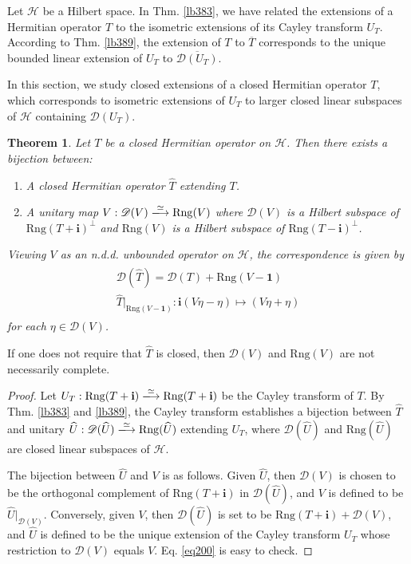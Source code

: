 \documentclass[12pt,b5paper,notitlepage]{article}
\theoremstyle{definition}
\theoremstyle{plain}
\newtheorem{thm}[df]{Theorem}
\newcommand{\wht}{\widehat}
\newcommand{\ovl}{\overline}
\newcommand{\idt}{\mathbf{1}}
\newcommand{\Dom}{\mathscr{D}}
\newcommand{\im}{\mathbf{i}}
\newcommand{\Rng}{\mathrm{Rng}}
\newcommand{\MH}{\mathcal H}
\numberwithin{equation}{section}
\begin{document}
Let $\MH$ be a Hilbert space. In Thm. \ref{lb383}, we have related the extensions of a Hermitian operator $T$ to the isometric extensions of its Cayley transform $U_T$. According to Thm. \ref{lb389}, the extension of $T$ to $\ovl T$ corresponds to the unique bounded linear extension of $U_T$ to $\ovl{\Dom(U_T)}$.

In this section, we study closed extensions of a closed Hermitian operator $T$, which corresponds to isometric extensions of $U_T$ to larger closed linear subspaces of $\MH$ containing $\Dom(U_T)$.



\begin{thm}\label{lb396}
Let $T$ be a closed Hermitian operator on $\MH$. Then there exists a bijection between:
\begin{enumerate}
\item[(1)] A closed Hermitian operator $\wht T$ extending $T$.
\item[(2)] A unitary map $V:\Dom(V)\xlongrightarrow{\simeq}\Rng(V)$ where $\Dom(V)$ is a Hilbert subspace of $\Rng(T+\im)^\perp$ and $\Rng(V)$ is a Hilbert subspace of $\Rng(T-\im)^\perp$.
\end{enumerate}
Viewing $V$ as an n.d.d. unbounded operator on $\MH$, the correspondence is given by
\begin{gather}\label{eq200}
\begin{gathered}
\Dom(\wht T)=\Dom(T)+\Rng(V-\idt)\\
\wht T|_{\Rng(V-\idt)}:\im(V\eta-\eta)\mapsto (V\eta+\eta)
\end{gathered}
\end{gather}
for each $\eta\in\Dom(V)$.
\end{thm}

If one does not require that $\wht T$ is closed, then $\Dom(V)$ and $\Rng(V)$ are not necessarily complete.

\begin{proof}
Let $U_T:\Rng(T+\im)\xlongrightarrow{\simeq}\Rng(T+\im)$ be the Cayley transform of $T$. By Thm. \ref{lb383} and \ref{lb389}, the Cayley transform establishes a bijection between $\wht T$ and unitary $\wht U:\Dom(\wht U)\xlongrightarrow{\simeq}\Rng(\wht U)$ extending $U_T$, where $\Dom(\wht U)$ and $\Rng(\wht U)$ are closed linear subspaces of $\MH$.

The bijection between $\wht U$ and $V$ is as follows. Given $\wht U$, then $\Dom(V)$ is chosen to be the orthogonal complement of $\Rng(T+\im)$ in $\Dom(\wht U)$, and $V$ is defined to be $\wht U|_{\Dom(V)}$. Conversely, given $V$, then $\Dom(\wht U)$ is set to be $\Rng(T+\im)+\Dom(V)$, and $\wht U$ is defined to be the unique extension of the Cayley transform $U_T$ whose restriction to $\Dom(V)$ equals $V$. Eq. \ref{eq200} is easy to check.
\end{proof}
\end{document}
